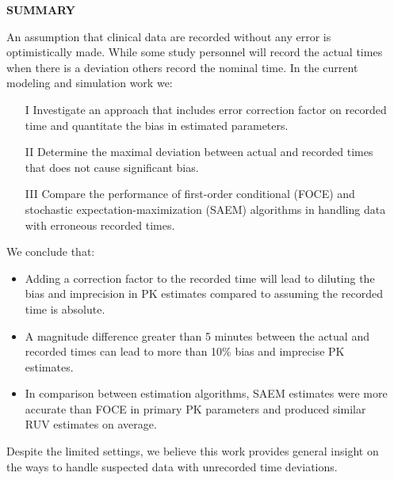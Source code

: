 \documentclass[final]{beamer}
\newlength{\sepwidth}
\newlength{\colwidth}
\newcommand{\separatorcolumn}{\begin{column}{\sepwidth}\end{column}}
\begin{document}
\begin{frame}[t]
\begin{columns}[t]
\separatorcolumn

\begin{column}{\colwidth}

  \begin{alertblock}{\textbf{SUMMARY}}

An assumption that clinical data are recorded without any error is optimistically made. While some study personnel will record the actual times when there is a deviation others record the nominal time. In the current modeling and simulation work we:
\begin{itemize}
\item[I] Investigate an approach that includes error correction factor on recorded time and quantitate the bias in estimated parameters.
\item[II] Determine the maximal deviation between actual and recorded times that does not cause significant bias.
\item[III] Compare the performance of first-order conditional (FOCE) and stochastic expectation-maximization (SAEM) algorithms in handling data with erroneous recorded times.
\end{itemize}
We conclude that:
\begin{itemize}
    \item Adding a correction factor to the recorded time will lead to diluting the bias and imprecision in PK estimates compared to assuming the recorded time is absolute.
    \item A magnitude difference greater than 5 minutes between the actual and recorded times can lead to more than 10\% bias and imprecise PK estimates.
    \item In comparison between estimation algorithms, SAEM estimates were more accurate than FOCE in primary PK parameters and produced similar RUV estimates on average.
\end{itemize}

Despite the limited settings, we believe this work provides general insight on the ways to handle suspected data with unrecorded time deviations.


\end{alertblock}
\end{column}
\end{columns}
\end{frame}
\end{document}
